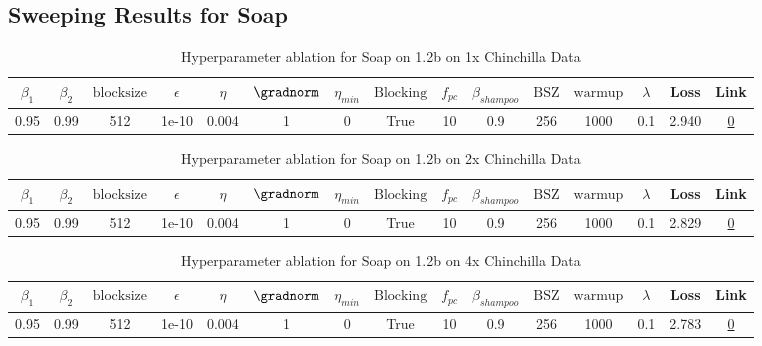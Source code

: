 \subsection{Sweeping Results for Soap}%
\begin{table}[H]
\centering
\caption{Hyperparameter ablation for Soap on 1.2b on 1x Chinchilla Data}
\label{tab:ablation_soap_1.2b_on_1x_chinchilla_data}
\begin{tabular}{ccccccccccccccc}
\toprule
$\beta_1$ & $\beta_2$ & $\mathrm{block size}$ & $\epsilon$ & $\eta$ & $\gradnorm$ & $\eta_{min}$ & $\mathrm{Blocking}$ & $f_{pc}$ & $\beta_{shampoo}$ & $\mathrm{BSZ}$ & $\mathrm{warmup}$ & $\lambda$ & Loss & Link \\
\midrule
0.95 & 0.99 & 512 & 1e-10 & 0.004 & 1 & 0 & True & 10 & 0.9 & 256 & 1000 & 0.1 & 2.940 & \href{https://wandb.ai/stanford-mercury/optimizer-scaling/runs/sweep-1.2b-24B-soapebf16d04f58lr0.004-wd0.1-minlr0.0-warmup1000--82b8d3}{0} \\
\midrule
\bottomrule
\end{tabular}
\end{table}

\begin{table}[H]
\centering
\caption{Hyperparameter ablation for Soap on 1.2b on 2x Chinchilla Data}
\label{tab:ablation_soap_1.2b_on_2x_chinchilla_data}
\begin{tabular}{ccccccccccccccc}
\toprule
$\beta_1$ & $\beta_2$ & $\mathrm{block size}$ & $\epsilon$ & $\eta$ & $\gradnorm$ & $\eta_{min}$ & $\mathrm{Blocking}$ & $f_{pc}$ & $\beta_{shampoo}$ & $\mathrm{BSZ}$ & $\mathrm{warmup}$ & $\lambda$ & Loss & Link \\
\midrule
0.95 & 0.99 & 512 & 1e-10 & 0.004 & 1 & 0 & True & 10 & 0.9 & 256 & 1000 & 0.1 & 2.829 & \href{https://wandb.ai/stanford-mercury/optimizer-scaling/runs/sweep-1.2b-48B-soapeweightf32ae127elr0.004-wd0.1-minlr0.0-warmup-000547}{0} \\
\midrule
\bottomrule
\end{tabular}
\end{table}

\begin{table}[H]
\centering
\caption{Hyperparameter ablation for Soap on 1.2b on 4x Chinchilla Data}
\label{tab:ablation_soap_1.2b_on_4x_chinchilla_data}
\begin{tabular}{ccccccccccccccc}
\toprule
$\beta_1$ & $\beta_2$ & $\mathrm{block size}$ & $\epsilon$ & $\eta$ & $\gradnorm$ & $\eta_{min}$ & $\mathrm{Blocking}$ & $f_{pc}$ & $\beta_{shampoo}$ & $\mathrm{BSZ}$ & $\mathrm{warmup}$ & $\lambda$ & Loss & Link \\
\midrule
0.95 & 0.99 & 512 & 1e-10 & 0.004 & 1 & 0 & True & 10 & 0.9 & 256 & 1000 & 0.1 & 2.783 & \href{https://wandb.ai/stanford-mercury/optimizer-scaling/runs/sweep-1.2b-96B-soapeweightf321bf579lr0.004-wd0.1-minlr0.0-warmup-7fd4b6}{0} \\
\midrule
\bottomrule
\end{tabular}
\end{table}


